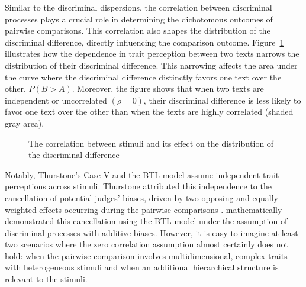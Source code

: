 \documentclass[
  authoryear,
  preprint,
  1p]{elsarticle}
\begin{document}
Similar to the discriminal dispersions, the correlation between
discriminal processes plays a crucial role in determining the
dichotomous outcomes of pairwise comparisons. This correlation also
shapes the distribution of the discriminal difference, directly
influencing the comparison outcome. Figure~\ref{fig-correlation}
illustrates how the dependence in trait perception between two texts
narrows the distribution of their discriminal difference. This narrowing
affects the area under the curve where the discriminal difference
distinctly favors one text over the other, \(P(B>A)\). Moreover, the
figure shows that when two texts are independent or uncorrelated
\((\rho=0)\), their discriminal difference is less likely to favor one
text over the other than when the texts are highly correlated (shaded
gray area).

\begin{figure}


\caption{\label{fig-correlation}The correlation between stimuli and its
effect on the distribution of the discriminal difference}

\end{figure}%

Notably, Thurstone's Case V and the BTL model assume independent trait
perceptions across stimuli. Thurstone attributed this independence to
the cancellation of potential judges' biases, driven by two opposing and
equally weighted effects occurring during the pairwise comparisons
\citep[pp.~268]{Thurstone_1927b}. \citet{Andrich_1978} mathematically
demonstrated this cancellation using the BTL model under the assumption
of discriminal processes with additive biases. However, it is easy to
imagine at least two scenarios where the zero correlation assumption
almost certainly does not hold: when the pairwise comparison involves
multidimensional, complex traits with heterogeneous stimuli and when an
additional hierarchical structure is relevant to the stimuli.
\end{document}
